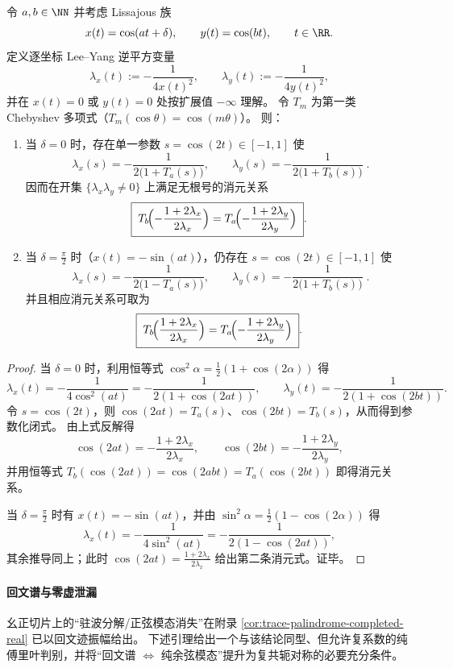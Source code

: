 \begin{theorem}\label{thm:leyang-lissajous-leyang-chebyshev-elimination-special-phases}
令 \(a,b\in\NN\) 并考虑 Lissajous 族
\[
x(t)=\cos(at+\delta),\qquad y(t)=\cos(bt),
\qquad t\in\RR.
\]
定义逐坐标 Lee--Yang 逆平方变量
\[
\lambda_x(t):=-\frac{1}{4x(t)^2},\qquad \lambda_y(t):=-\frac{1}{4y(t)^2},
\]
并在 \(x(t)=0\) 或 \(y(t)=0\) 处按扩展值 \(-\infty\) 理解。
令 \(T_m\) 为第一类 Chebyshev 多项式（\(T_m(\cos\theta)=\cos(m\theta)\)）。
则：
\begin{enumerate}
  \item 当 \(\delta=0\) 时，存在单一参数 \(s=\cos(2t)\in[-1,1]\) 使
  \[
  \boxed{\;
  \lambda_x(s)=-\frac{1}{2\bigl(1+T_a(s)\bigr)},\qquad
  \lambda_y(s)=-\frac{1}{2\bigl(1+T_b(s)\bigr)}\; }.
  \]
  因而在开集 \(\{\lambda_x\lambda_y\neq 0\}\) 上满足无根号的消元关系
  \[
  \boxed{\;
  T_b\!\Bigl(-\frac{1+2\lambda_x}{2\lambda_x}\Bigr)
  =
  T_a\!\Bigl(-\frac{1+2\lambda_y}{2\lambda_y}\Bigr)\; }.
  \]
  \item 当 \(\delta=\frac{\pi}{2}\) 时（\(x(t)=-\sin(at)\)），仍存在 \(s=\cos(2t)\in[-1,1]\) 使
  \[
  \boxed{\;
  \lambda_x(s)=-\frac{1}{2\bigl(1-T_a(s)\bigr)},\qquad
  \lambda_y(s)=-\frac{1}{2\bigl(1+T_b(s)\bigr)}\; }.
  \]
  并且相应消元关系可取为
  \[
  \boxed{\;
  T_b\!\Bigl(\frac{1+2\lambda_x}{2\lambda_x}\Bigr)
  =
  T_a\!\Bigl(-\frac{1+2\lambda_y}{2\lambda_y}\Bigr)\; }.
  \]
\end{enumerate}
\end{theorem}
\begin{proof}
当 \(\delta=0\) 时，利用恒等式 \(\cos^2\alpha=\frac12(1+\cos(2\alpha))\) 得
\[
\lambda_x(t)=-\frac{1}{4\cos^2(at)}=-\frac{1}{2(1+\cos(2at))},
\qquad
\lambda_y(t)=-\frac{1}{2(1+\cos(2bt))}.
\]
令 \(s=\cos(2t)\)，则 \(\cos(2at)=T_a(s)\)、\(\cos(2bt)=T_b(s)\)，从而得到参数化闭式。
由上式反解得
\[
\cos(2at)=-\frac{1+2\lambda_x}{2\lambda_x},\qquad
\cos(2bt)=-\frac{1+2\lambda_y}{2\lambda_y},
\]
并用恒等式 \(T_b(\cos(2at))=\cos(2abt)=T_a(\cos(2bt))\) 即得消元关系。
\par
当 \(\delta=\frac{\pi}{2}\) 时有 \(x(t)=-\sin(at)\)，并由 \(\sin^2\alpha=\frac12(1-\cos(2\alpha))\) 得
\[
\lambda_x(t)=-\frac{1}{4\sin^2(at)}=-\frac{1}{2(1-\cos(2at))},
\]
其余推导同上；此时 \(\cos(2at)=\frac{1+2\lambda_x}{2\lambda_x}\) 给出第二条消元式。证毕。
\end{proof}

\paragraph{回文谱与零虚泄漏}
幺正切片上的“驻波分解/正弦模态消失”在附录 \ref{cor:trace-palindrome-completed-real} 已以回文迹振幅给出。
下述引理给出一个与该结论同型、但允许复系数的纯傅里叶判别，并将“回文谱 \(\Longleftrightarrow\) 纯余弦模态”提升为复共轭对称的必要充分条件。


